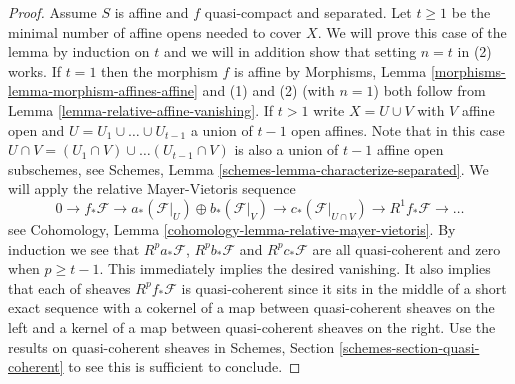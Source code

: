\begin{proof}
\medskip\noindent
Assume $S$ is affine and $f$ quasi-compact and separated.
Let $t \geq 1$ be the minimal number of affine opens needed to cover $X$.
We will prove this case of the lemma by induction on $t$ and we will in
addition show that setting $n = t$ in (2) works.
If $t = 1$ then the morphism $f$ is affine by
Morphisms, Lemma \ref{morphisms-lemma-morphism-affines-affine}
and (1) and (2) (with $n = 1$)
both follow from Lemma \ref{lemma-relative-affine-vanishing}.
If $t > 1$ write $X = U \cup V$ with $V$ affine open and
$U = U_1 \cup \ldots \cup U_{t - 1}$ a union of $t - 1$ open affines.
Note that in this case
$U \cap V =  (U_1 \cap V) \cup \ldots (U_{t - 1} \cap V)$
is also a union of $t - 1$ affine open subschemes, see
Schemes, Lemma \ref{schemes-lemma-characterize-separated}.
We will apply the relative Mayer-Vietoris sequence
$$
0 \to
f_*\mathcal{F} \to
a_*(\mathcal{F}|_U) \oplus b_*(\mathcal{F}|_V) \to
c_*(\mathcal{F}|_{U \cap V}) \to
R^1f_*\mathcal{F} \to \ldots
$$
see Cohomology, Lemma \ref{cohomology-lemma-relative-mayer-vietoris}.
By induction we see that
$R^pa_*\mathcal{F}$, $R^pb_*\mathcal{F}$ and $R^pc_*\mathcal{F}$
are all quasi-coherent and zero when $p \geq t - 1$. This immediately
implies the desired vanishing. It also implies that each of sheaves
$R^pf_*\mathcal{F}$ is quasi-coherent since it sits in the middle of a short
exact sequence with a cokernel of a map between quasi-coherent sheaves
on the left and a kernel of a map between quasi-coherent sheaves on the right.
Use the results on quasi-coherent sheaves in
Schemes, Section \ref{schemes-section-quasi-coherent} to see
this is sufficient to conclude.


\end{proof}
